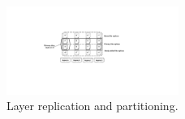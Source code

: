 \begin{figure}[t]
	\centering
	\centering
	\includegraphics[width=0.5\textwidth]{graphs/replication.pdf}
	\caption{Layer replication and partitioning.}
	\label{fig:replication-partition}
\end{figure}